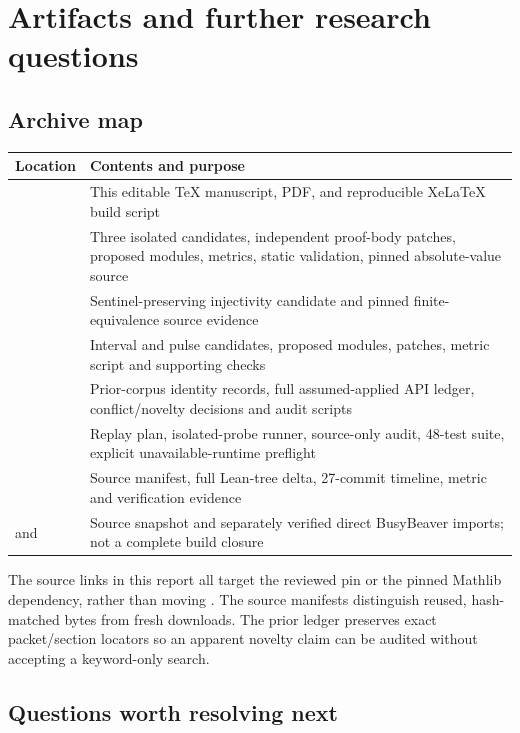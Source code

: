 \section{Artifacts and further research questions}

\subsection{Archive map}

\begin{tabularx}{\linewidth}{@{}L{1.60in}Y@{}}
\toprule
Location & Contents and purpose \\
\midrule
{} & This editable TeX manuscript, PDF, and reproducible XeLaTeX build script \\
 & Three isolated candidates, independent proof-body patches, proposed modules, metrics, static validation, pinned absolute-value source \\
 & Sentinel-preserving injectivity candidate and pinned finite-equivalence source evidence \\
 & Interval and pulse candidates, proposed modules, patches, metric script and supporting checks \\
 & Prior-corpus identity records, full assumed-applied API ledger, conflict/novelty decisions and audit scripts \\
 & Replay plan, isolated-probe runner, source-only audit, 48-test suite, explicit unavailable-runtime preflight \\
 & Source manifest, full Lean-tree delta, 27-commit timeline, metric and verification evidence \\
 and  & Source snapshot and separately verified direct BusyBeaver imports; not a complete build closure \\
\bottomrule
\end{tabularx}

The source links in this report all target the reviewed pin or the pinned Mathlib dependency, rather than moving . The source manifests distinguish reused, hash-matched bytes from fresh downloads. The prior ledger preserves exact packet/section locators so an apparent novelty claim can be audited without accepting a keyword-only search.

\subsection{Questions worth resolving next}

